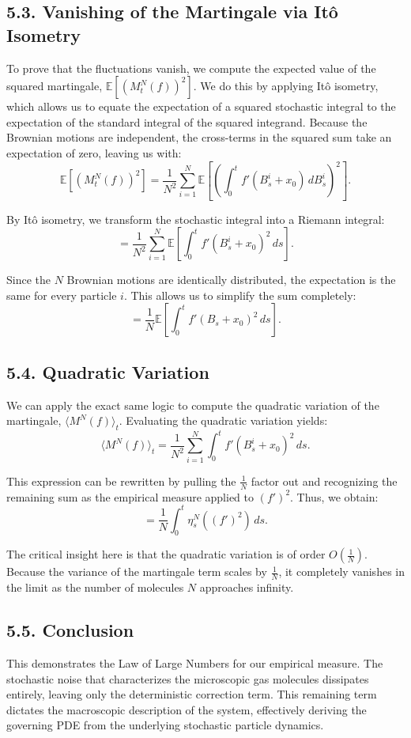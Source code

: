 \documentclass[11pt]{article}
\theoremstyle{definition}
\theoremstyle{remark}
\begin{document}
\subsection*{5.3. Vanishing of the Martingale via It\^o Isometry}
To prove that the fluctuations vanish, we compute the expected value of the squared martingale, $\mathbb E[(M_t^N(f))^2]$. We do this by applying It\^o isometry, which allows us to equate the expectation of a squared stochastic integral to the expectation of the standard integral of the squared integrand. Because the Brownian motions are independent, the cross-terms in the squared sum take an expectation of zero, leaving us with:
\[
\mathbb E[(M_t^N(f))^2]
=
\frac{1}{N^2}\sum_{i=1}^N
\mathbb E\!\left[
\left(\int_0^t f'(B_s^i+x_0)\,dB_s^i\right)^2
\right].
\]

By It\^o isometry, we transform the stochastic integral into a Riemann integral:
\[
=
\frac{1}{N^2}\sum_{i=1}^N
\mathbb E\!\left[
\int_0^t f'(B_s^i+x_0)^2\,ds
\right].
\]

Since the $N$ Brownian motions are identically distributed, the expectation is the same for every particle $i$. This allows us to simplify the sum completely:
\[
=
\frac{1}{N}
\mathbb E\!\left[
\int_0^t f'(B_s+x_0)^2\,ds
\right].
\]

\subsection*{5.4. Quadratic Variation}
We can apply the exact same logic to compute the quadratic variation of the martingale, $\langle M^N(f)\rangle_t$. Evaluating the quadratic variation yields:
\[
\langle M^N(f)\rangle_t
=
\frac{1}{N^2}\sum_{i=1}^N
\int_0^t f'(B_s^i+x_0)^2\,ds.
\]

This expression can be rewritten by pulling the $\frac{1}{N}$ factor out and recognizing the remaining sum as the empirical measure applied to $(f')^2$. Thus, we obtain:
\[
=
\frac{1}{N}\int_0^t \eta_s^N((f')^2)\,ds.
\]

The critical insight here is that the quadratic variation is of order $O\!\left(\frac{1}{N}\right)$. Because the variance of the martingale term scales by $\frac{1}{N}$, it completely vanishes in the limit as the number of molecules $N$ approaches infinity.

\subsection*{5.5. Conclusion}
This demonstrates the Law of Large Numbers for our empirical measure. The stochastic noise that characterizes the microscopic gas molecules dissipates entirely, leaving only the deterministic correction term. This remaining term dictates the macroscopic description of the system, effectively deriving the governing PDE from the underlying stochastic particle dynamics.
\end{document}

